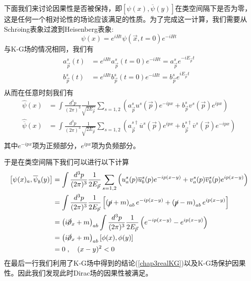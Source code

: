 下面我们来讨论因果性是否被保持，即$\left[\psi(x),\overline{\psi}(y)\right]$在类空间隔下是否为零，这是任何一个相对论性的场论应该满足的性质。为了完成这一计算，我们需要从Schr$\ddot{o}$ing表象过渡到Heisenberg表象:
\begin{equation}
    \psi(x)=e^{iHt}\psi(\vec{x},t=0)e^{-iHt}
\end{equation}
与K-G场的情况相同，我们有
\begin{equation}
    \begin{aligned}
    a_{\vec{p}}^{s}(t)&=e^{iHt}a^{s}_{\vec{p}}(t=0)e^{-iHt}=a_{\vec{p}}^{s}e^{-iE_{\vec{p}}t}\\
     b_{\vec{p}}^{s}(t)&=e^{iHt}b^{s}_{\vec{p}}(t=0)e^{-iHt}=b_{\vec{p}}^{s}e^{iE_{\vec{p}}t}\\
    \end{aligned}
\end{equation}
从而在任意时刻我们有
\begin{equation}
\begin{aligned}
    \hat{\psi}(x)&=\int \frac{d^{3}p}{(2\pi)^{3}}\frac{1}{\sqrt{2E_{\vec{p}}}}\sum\limits_{s=1,2}\left(a^{s}_{\vec{p}}u^{s}(\vec{p})e^{-ipx}+b^{s}_{\vec{p}}v^{s}(\vec{p})e^{ipx}\right)\\
    \hat{\overline{\psi}}(x)&=\int \frac{d^{3}p}{(2\pi)^{3}}\frac{1}{\sqrt{2E_{\vec{p}}}}\sum\limits_{s=1,2}\left(a^{s\dagger}_{\vec{p}}\overline{u}^{s}(\vec{p})e^{ipx}+b^{s\dagger}_{\vec{p}}\overline{v}^{s}(\vec{p})e^{-ipx}\right)\\
    \end{aligned}
\end{equation}
其中$e^{-ipx}$项为正频部分，$e^{ipx}$项为负频部分。

于是在类空间隔下我们可以进行以下计算
\begin{equation}
\label{chap4fakedirac}
    \begin{aligned}
        \left[\psi(x)_{a},\overline{\psi}_{b}(y)\right]&=\int \frac{d^{3}p}{(2\pi)^{3}}\frac{1}{2E_{\vec{p}}}\sum\limits_{s=1,2}\left(u_{a}^{s}(p)\overline{u}_{b}^{s}(p)e^{-ip(x-y)}+v_{a}^{s}(p)\overline{v}_{b}^{s}(p)e^{ip(x-y)}\right)\\
        &=\int \frac{d^{3}p}{(2\pi)^{3}}\frac{1}{2E_{\vec{p}}}\left[\left(\cancel{p}+m\right)_{ab}e^{-ip(x-y)}+\left(\cancel{p}-m\right)_{ab}e^{ip(x-y)}\right]\\
        &=\left(i\cancel{\partial}_{x}+m\right)_{
        ab}\int \frac{d^{3}p}{(2\pi)^{3}}\frac{1}{2E_{\vec{p}}}\left(e^{-ip(x-y)}-e^{ip(x-y)}\right)\\
        &=\left(i\cancel{\partial}_{x}+m\right)_{
        ab}\left[\phi(x),\phi(y)\right]\\
        &=0\;,\quad(x-y)^{2}<0
    \end{aligned}
\end{equation}
在最后一行我们利用了K-G场中得到的结论(\ref{chap3realKG})以及K-G场保护因果性。因此我们发现此时Dirac场的因果性被满足。

